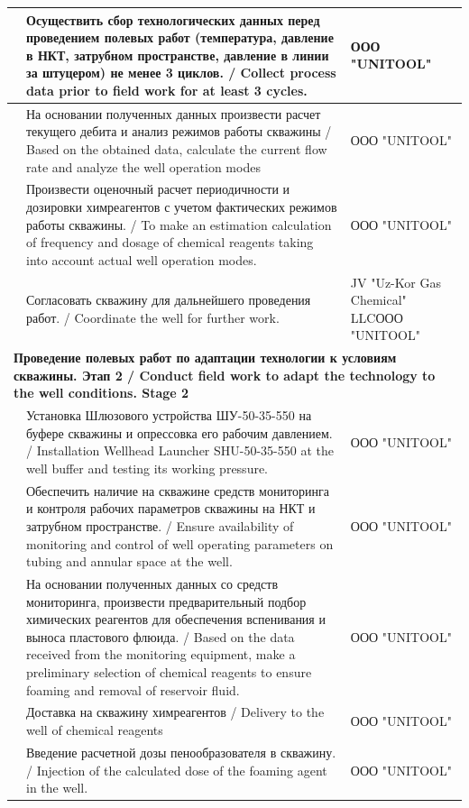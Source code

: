 \documentclass[11pt]{article}
\begin{document}
\begin{longtable}{|p{}|p{}|p{}|}
\hline
\centering 6 & Осуществить сбор технологических данных перед проведением полевых работ (температура, давление в НКТ, затрубном пространстве, давление в линии за штуцером) не менее 3 циклов. / Collect process data prior to field work for at least 3 cycles. & ООО "UNITOOL" \\
\hline
\centering 7 & На основании полученных данных произвести расчет текущего дебита и анализ режимов работы скважины / Based on the obtained data, calculate the current flow rate and analyze the well operation modes & ООО "UNITOOL" \\
\hline
\centering 8 & Произвести оценочный расчет периодичности и дозировки химреагентов с учетом фактических режимов работы скважины. / To make an estimation calculation of frequency and dosage of chemical reagents taking into account actual well operation modes. & ООО "UNITOOL" \\
\hline
\centering 9 & Согласовать скважину для дальнейшего проведения работ. / Coordinate the well for further work. & JV "Uz-Kor Gas Chemical" LLC\newline ООО "UNITOOL" \\
\hline
\multicolumn{3}{|l|}{\textbf{Проведение полевых работ по адаптации технологии к условиям скважины. Этап 2 / Conduct field work to adapt the technology to the well conditions. Stage 2}} \\
\hline
\centering 10 & Установка Шлюзового устройства ШУ-50-35-550 на буфере скважины и опрессовка его рабочим давлением. / Installation Wellhead Launcher SHU-50-35-550 at the well buffer and testing its working pressure. & ООО "UNITOOL" \\
\hline
\centering 11 & Обеспечить наличие на скважине средств мониторинга и контроля рабочих параметров скважины на НКТ и затрубном пространстве. / Ensure availability of monitoring and control of well operating parameters on tubing and annular space at the well. & ООО "UNITOOL" \\
\hline
\centering 12 & На основании полученных данных со средств мониторинга, произвести предварительный подбор химических реагентов для обеспечения вспенивания и выноса пластового флюида. / Based on the data received from the monitoring equipment, make a preliminary selection of chemical reagents to ensure foaming and removal of reservoir fluid. & ООО "UNITOOL" \\
\hline
\centering 13 & Доставка на скважину химреагентов / Delivery to the well of chemical reagents & ООО "UNITOOL" \\
\hline
\centering 14 & Введение расчетной дозы пенообразователя в скважину. / Injection of the calculated dose of the foaming agent in the well. & ООО "UNITOOL" \\

\end{longtable}
\end{document}
